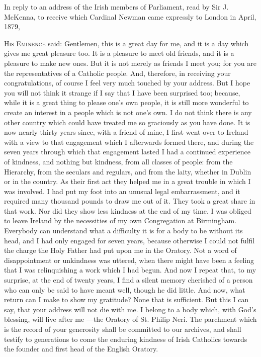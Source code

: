 
In reply to an address of the Irish members of
Parliament, read by Sir J. McKenna, to receive which Cardinal Newman
came expressly to London in April, 1879,

H\textsc{is} E\textsc{minence}
said: Gentlemen, this is a great day for me, and it is a day which
gives me great pleasure too. It is a pleasure to meet old friends, and
it is a pleasure to make new ones. But it is not merely as friends I
meet you; for you are the representatives of a Catholic people. And,
therefore, in receiving your congratulations, of course I feel very
much touched by your address. But I hope you will not think it strange
if I say that I have been surprised too; because, while it is a great
thing to please one's own people, it is still more wonderful to create
an interest in a people which is not one's own. I do not think there
is any other country which could have treated me so graciously as you
have done. It is now nearly thirty years since, with a friend of mine,
I first went over to Ireland with a view to that engagement which I
afterwards formed there, and during the seven years through which that
engagement lasted I had a continued experience of kindness, and
nothing but kindness, from all classes of people: from the Hierarchy,
from the seculars and regulars, and from the laity, whether in Dublin
or in the country. As their first act they helped me in a great
trouble in which I was involved. I had put my foot into an unusual
legal embarrassment, and it required many thousand pounds to draw me
out of it. They took a great share in that work. Nor did they show
less kindness at the end of my time. I was obliged to leave Ireland by
the necessities of my own Congregation at Birmingham. Everybody can
understand what a difficulty it is for a body to be without its head,
and I had only engaged for seven years, because otherwise I could not
fulfil the charge the Holy Father had put upon me in the Oratory. Not
a word of disappointment or unkindness was uttered, when there might
have been a feeling that I was relinquishing a work which I had begun.
And now I repeat that, to my surprise, at the end of twenty years, I
find a silent memory cherished of a person who can only be said to
have meant well, though he did little. And now, what return can I make
to show my gratitude? None that is sufficient. But this I can say,
that your address will not die with me. I belong to a body which, with
God's blessing, will live after me —the Oratory of St. Philip
Neri. The parchment which is the record of your generosity shall be
committed to our archives, and shall testify to generations to come
the enduring kindness of Irish Catholics towards the founder and first
head of the English Oratory.

